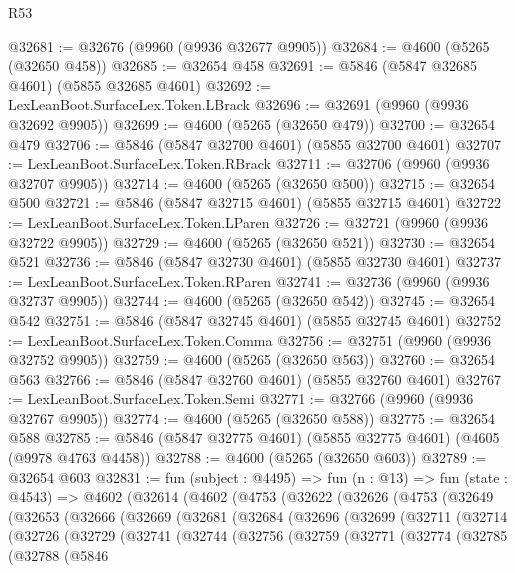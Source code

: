 \begin{lexlean}{R53}
\begin{coremodule}
@32681 := @32676 (@9960 (@9936 @32677 @9905))
@32684 := @4600 (@5265 (@32650 @458))
@32685 := @32654 @458
@32691 := @5846 (@5847 @32685 @4601) (@5855 @32685 @4601)
@32692 := LexLeanBoot.SurfaceLex.Token.LBrack
@32696 := @32691 (@9960 (@9936 @32692 @9905))
@32699 := @4600 (@5265 (@32650 @479))
@32700 := @32654 @479
@32706 := @5846 (@5847 @32700 @4601) (@5855 @32700 @4601)
@32707 := LexLeanBoot.SurfaceLex.Token.RBrack
@32711 := @32706 (@9960 (@9936 @32707 @9905))
@32714 := @4600 (@5265 (@32650 @500))
@32715 := @32654 @500
@32721 := @5846 (@5847 @32715 @4601) (@5855 @32715 @4601)
@32722 := LexLeanBoot.SurfaceLex.Token.LParen
@32726 := @32721 (@9960 (@9936 @32722 @9905))
@32729 := @4600 (@5265 (@32650 @521))
@32730 := @32654 @521
@32736 := @5846 (@5847 @32730 @4601) (@5855 @32730 @4601)
@32737 := LexLeanBoot.SurfaceLex.Token.RParen
@32741 := @32736 (@9960 (@9936 @32737 @9905))
@32744 := @4600 (@5265 (@32650 @542))
@32745 := @32654 @542
@32751 := @5846 (@5847 @32745 @4601) (@5855 @32745 @4601)
@32752 := LexLeanBoot.SurfaceLex.Token.Comma
@32756 := @32751 (@9960 (@9936 @32752 @9905))
@32759 := @4600 (@5265 (@32650 @563))
@32760 := @32654 @563
@32766 := @5846 (@5847 @32760 @4601) (@5855 @32760 @4601)
@32767 := LexLeanBoot.SurfaceLex.Token.Semi
@32771 := @32766 (@9960 (@9936 @32767 @9905))
@32774 := @4600 (@5265 (@32650 @588))
@32775 := @32654 @588
@32785 := @5846 (@5847 @32775 @4601) (@5855 @32775 @4601) (@4605 (@9978 @4763 @4458))
@32788 := @4600 (@5265 (@32650 @603))
@32789 := @32654 @603
@32831 := fun (subject : @4495) =>
  fun (n : @13) =>
  fun (state : @4543) =>
  @4602
    (@32614
      (@4602
        (@4753
          (@32622
            (@32626
              (@4753
                (@32649
                  (@32653
                    (@32666
                      (@32669
                        (@32681
                          (@32684
                            (@32696
                              (@32699
                                (@32711
                                  (@32714
                                    (@32726
                                      (@32729
                                        (@32741
                                          (@32744
                                            (@32756
                                              (@32759
                                                (@32771
                                                  (@32774
                                                    (@32785
                                                      (@32788
                                                        (@5846

\end{coremodule}
\end{lexlean}
